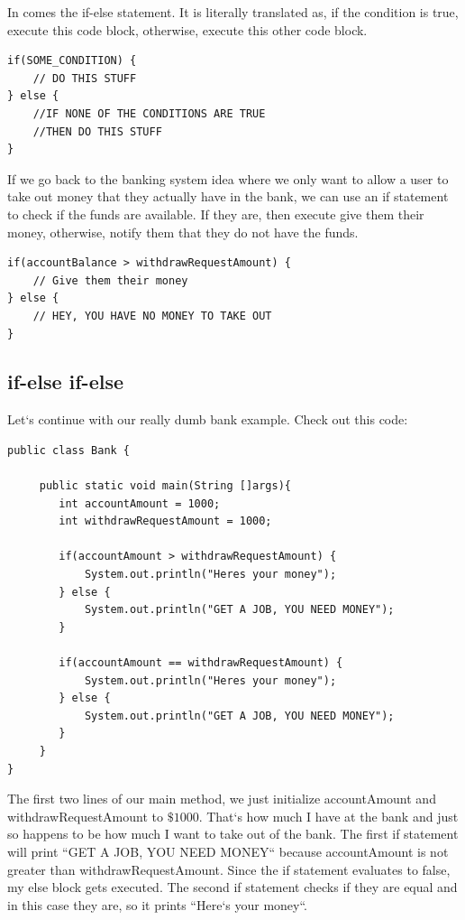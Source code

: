\documentclass[11]{article}
\begin{document}
In comes the if-else statement. It is literally translated as, if the condition is true, execute this code block, otherwise, execute this other code block.

\begin{lstlisting}
if(SOME_CONDITION) {
    // DO THIS STUFF
} else {
    //IF NONE OF THE CONDITIONS ARE TRUE
    //THEN DO THIS STUFF
}
\end{lstlisting}

If we go back to the banking system idea where we only want to allow a user to take out money that they actually have in the bank, we can use an if statement to check if the funds are available. If they are, then execute give them their money, otherwise, notify them that they do not have the funds.
\begin{lstlisting}
if(accountBalance > withdrawRequestAmount) {
    // Give them their money
} else {
	// HEY, YOU HAVE NO MONEY TO TAKE OUT
}
\end{lstlisting}

\subsection{if-else if-else}
Let`s continue with our really dumb bank example. Check out this code:

\begin{lstlisting}
public class Bank {

     public static void main(String []args){
        int accountAmount = 1000;
        int withdrawRequestAmount = 1000;
        
        if(accountAmount > withdrawRequestAmount) {
            System.out.println("Heres your money");
        } else {
            System.out.println("GET A JOB, YOU NEED MONEY");
        }
        
        if(accountAmount == withdrawRequestAmount) {
            System.out.println("Heres your money");
        } else {
            System.out.println("GET A JOB, YOU NEED MONEY");
        }
     }
}
\end{lstlisting}

The first two lines of our main method, we just initialize accountAmount and withdrawRequestAmount to $\$1000$. That`s how much I have at the bank and just so happens to be how much I want to take out of the bank. The first if statement will print ``GET A JOB, YOU NEED MONEY`` because accountAmount is not greater than withdrawRequestAmount. Since the if statement evaluates to false, my else block gets executed. The second if statement checks if they are equal and in this case they are, so it prints ``Here`s your money``.  \\
\end{document}
